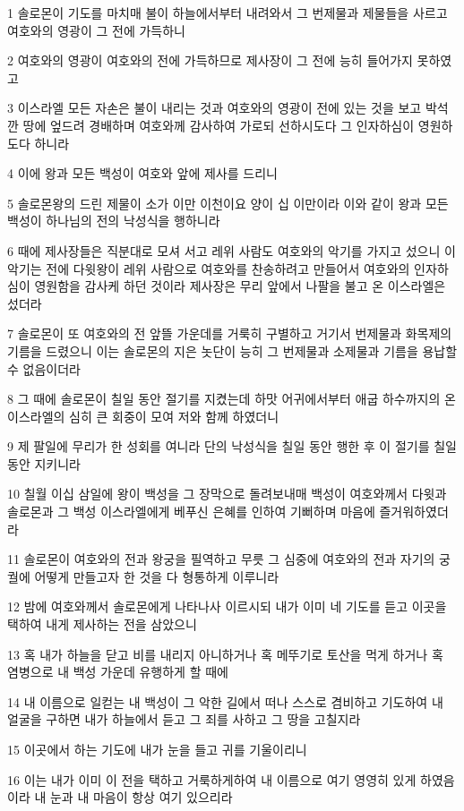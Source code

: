 \par 1 솔로몬이 기도를 마치매 불이 하늘에서부터 내려와서 그 번제물과 제물들을 사르고 여호와의 영광이 그 전에 가득하니
\par 2 여호와의 영광이 여호와의 전에 가득하므로 제사장이 그 전에 능히 들어가지 못하였고
\par 3 이스라엘 모든 자손은 불이 내리는 것과 여호와의 영광이 전에 있는 것을 보고 박석 깐 땅에 엎드려 경배하며 여호와께 감사하여 가로되 선하시도다 그 인자하심이 영원하도다 하니라
\par 4 이에 왕과 모든 백성이 여호와 앞에 제사를 드리니
\par 5 솔로몬왕의 드린 제물이 소가 이만 이천이요 양이 십 이만이라 이와 같이 왕과 모든 백성이 하나님의 전의 낙성식을 행하니라
\par 6 때에 제사장들은 직분대로 모셔 서고 레위 사람도 여호와의 악기를 가지고 섰으니 이 악기는 전에 다윗왕이 레위 사람으로 여호와를 찬송하려고 만들어서 여호와의 인자하심이 영원함을 감사케 하던 것이라 제사장은 무리 앞에서 나팔을 불고 온 이스라엘은 섰더라
\par 7 솔로몬이 또 여호와의 전 앞뜰 가운데를 거룩히 구별하고 거기서 번제물과 화목제의 기름을 드렸으니 이는 솔로몬의 지은 놋단이 능히 그 번제물과 소제물과 기름을 용납할 수 없음이더라
\par 8 그 때에 솔로몬이 칠일 동안 절기를 지켰는데 하맛 어귀에서부터 애굽 하수까지의 온 이스라엘의 심히 큰 회중이 모여 저와 함께 하였더니
\par 9 제 팔일에 무리가 한 성회를 여니라 단의 낙성식을 칠일 동안 행한 후 이 절기를 칠일 동안 지키니라
\par 10 칠월 이십 삼일에 왕이 백성을 그 장막으로 돌려보내매 백성이 여호와께서 다윗과 솔로몬과 그 백성 이스라엘에게 베푸신 은혜를 인하여 기뻐하며 마음에 즐거워하였더라
\par 11 솔로몬이 여호와의 전과 왕궁을 필역하고 무릇 그 심중에 여호와의 전과 자기의 궁궐에 어떻게 만들고자 한 것을 다 형통하게 이루니라
\par 12 밤에 여호와께서 솔로몬에게 나타나사 이르시되 내가 이미 네 기도를 듣고 이곳을 택하여 내게 제사하는 전을 삼았으니
\par 13 혹 내가 하늘을 닫고 비를 내리지 아니하거나 혹 메뚜기로 토산을 먹게 하거나 혹 염병으로 내 백성 가운데 유행하게 할 때에
\par 14 내 이름으로 일컫는 내 백성이 그 악한 길에서 떠나 스스로 겸비하고 기도하여 내 얼굴을 구하면 내가 하늘에서 듣고 그 죄를 사하고 그 땅을 고칠지라
\par 15 이곳에서 하는 기도에 내가 눈을 들고 귀를 기울이리니
\par 16 이는 내가 이미 이 전을 택하고 거룩하게하여 내 이름으로 여기 영영히 있게 하였음이라 내 눈과 내 마음이 항상 여기 있으리라
